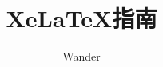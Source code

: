 \documentclass[12pt,oneside]{book}
\begin{document}
\title{XeLaTeX指南}
\author{Wander}

\makemytitleA
\end{document}
